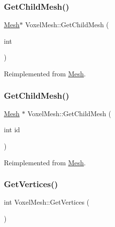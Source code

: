 \subsubsection{\texorpdfstring{GetChildMesh()}{GetChildMesh()}\hspace{0.1cm}{\footnotesize\ttfamily [1/2]}}
{\footnotesize\ttfamily \mbox{\hyperlink{class_mesh}{Mesh}}$\ast$ Voxel\+Mesh\+::\+Get\+Child\+Mesh (\begin{DoxyParamCaption}\item[{int}]{ }\end{DoxyParamCaption})\hspace{0.3cm}{\ttfamily [virtual]}}



Reimplemented from \mbox{\hyperlink{class_mesh_a6a97fe50af0e6b5bca76a15f73bbc1c0}{Mesh}}.

\mbox{\label{class_voxel_mesh_add1b9e40018be0b534747a6addee981d}} 
\subsubsection{\texorpdfstring{GetChildMesh()}{GetChildMesh()}\hspace{0.1cm}{\footnotesize\ttfamily [2/2]}}
{\footnotesize\ttfamily \mbox{\hyperlink{class_mesh}{Mesh}} $\ast$ Voxel\+Mesh\+::\+Get\+Child\+Mesh (\begin{DoxyParamCaption}\item[{int}]{id }\end{DoxyParamCaption})\hspace{0.3cm}{\ttfamily [virtual]}}



Reimplemented from \mbox{\hyperlink{class_mesh_a6a97fe50af0e6b5bca76a15f73bbc1c0}{Mesh}}.

\mbox{\label{class_voxel_mesh_a6a06be81275f5e98f77382ee9dfe9a07}} 
\subsubsection{\texorpdfstring{GetVertices()}{GetVertices()}\hspace{0.1cm}{\footnotesize\ttfamily [1/2]}}
{\footnotesize\ttfamily int Voxel\+Mesh\+::\+Get\+Vertices (\begin{DoxyParamCaption}{ }\end{DoxyParamCaption})\hspace{0.3cm}{\ttfamily [virtual]}}



